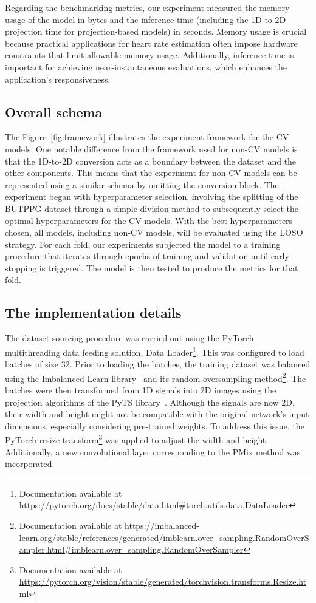 Regarding the benchmarking metrics, our experiment measured the memory usage of the model in bytes and the inference time (including the 1D-to-2D projection time for projection-based models) in seconds. Memory usage is crucial because practical applications for heart rate estimation often impose hardware constraints that limit allowable memory usage. Additionally, inference time is important for achieving near-instantaneous evaluations, which enhances the application's responsiveness.

\subsection{Overall schema}



The Figure~\ref{fig:framework} illustrates the experiment framework for the \gls{CV} models. One notable difference from the framework used for non-\gls{CV} models is that the 1D-to-2D conversion acts as a boundary between the dataset and the other components. This means that the experiment for non-\gls{CV} models can be represented using a similar schema by omitting the conversion block. The experiment began with hyperparameter selection, involving the splitting of the \gls{BUTPPG} dataset through a simple division method to subsequently select the optimal hyperparameters for the \gls{CV} models. With the best hyperparameters chosen, all models, including non-\gls{CV} models, will be evaluated using the \gls{LOSO} strategy. For each fold, our experiments subjected the model to a training procedure that iterates through epochs of training and validation until early stopping is triggered. The model is then tested to produce the metrics for that fold.
\subsection{The implementation details}

The dataset sourcing procedure was carried out using the PyTorch multithreading data feeding solution, Data Loader\footnote{Documentation available at \url{https://pytorch.org/docs/stable/data.html\#torch.utils.data.DataLoader}}. This was configured to load batches of size 32. Prior to loading the batches, the training dataset was balanced using the Imbalanced Learn library~\cite{ImbalancedLearn} and its random oversampling method\footnote{Documentation available at \url{https://imbalanced-learn.org/stable/references/generated/imblearn.over_sampling.RandomOverSampler.html\#imblearn.over_sampling.RandomOverSampler}}. The batches were then transformed from 1D signals into 2D images using the projection algorithms of the PyTS library~\cite{PyTS}. Although the signals are now 2D, their width and height might not be compatible with the original network's input dimensions, especially considering pre-trained weights. To address this issue, the PyTorch resize transform\footnote{Documentation available at \url{https://pytorch.org/vision/stable/generated/torchvision.transforms.Resize.html}} was applied to adjust the width and height. Additionally, a new convolutional layer corresponding to the \gls{PMix} method was incorporated.

